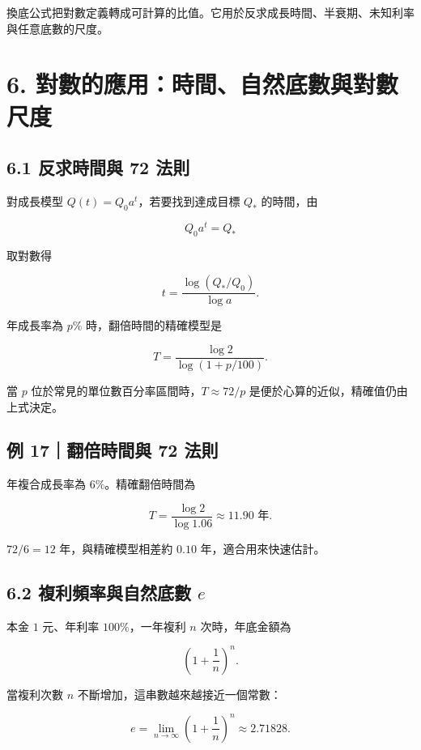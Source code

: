 \documentclass[11pt,a4paper]{article}
\begin{document}
換底公式把對數定義轉成可計算的比值。它用於反求成長時間、半衰期、未知利率與任意底數的尺度。

\section{6. 對數的應用：時間、自然底數與對數尺度}\label{ux5c0dux6578ux7684ux61c9ux7528ux6642ux9593ux81eaux7136ux5e95ux6578ux8207ux5c0dux6578ux5c3aux5ea6}

\subsection{6.1 反求時間與 72 法則}\label{ux53cdux6c42ux6642ux9593ux8207-72-ux6cd5ux5247}

對成長模型 \(Q(t)=Q_0a^t\)，若要找到達成目標 \(Q_*\) 的時間，由

\[
Q_0a^t=Q_*
\]

取對數得

\[
t=\frac{\log(Q_*/Q_0)}{\log a}.
\]

年成長率為 \(p\%\) 時，翻倍時間的精確模型是

\[
T=\frac{\log2}{\log(1+p/100)}.
\]

當 \(p\) 位於常見的單位數百分率區間時，\(T\approx72/p\) 是便於心算的近似，精確值仍由上式決定。

\subsection{例 17｜翻倍時間與 72 法則}\label{ux4f8b-17ux7ffbux500dux6642ux9593ux8207-72-ux6cd5ux5247}

年複合成長率為 \(6\%\)。精確翻倍時間為

\[
T=\frac{\log2}{\log1.06}\approx11.90\text{ 年}.
\]

\(72/6=12\) 年，與精確模型相差約 \(0.10\) 年，適合用來快速估計。

\subsection{\texorpdfstring{6.2 複利頻率與自然底數 \(e\)}{6.2 複利頻率與自然底數 e}}\label{ux8907ux5229ux983bux7387ux8207ux81eaux7136ux5e95ux6578-e}

本金 \(1\) 元、年利率 \(100\%\)，一年複利 \(n\) 次時，年底金額為

\[
\left(1+\frac1n\right)^n.
\]

當複利次數 \(n\) 不斷增加，這串數越來越接近一個常數：

\[
e=\lim_{n\to\infty}\left(1+\frac1n\right)^n\approx2.71828.
\]
\end{document}
